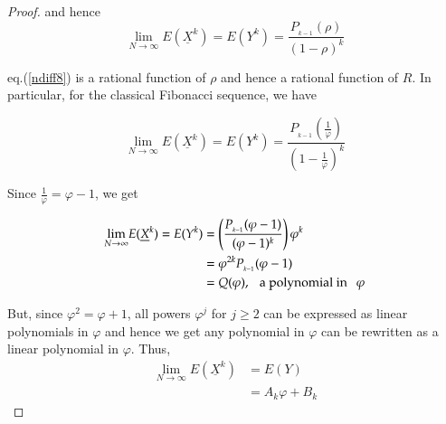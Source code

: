 \begin{multicols}{2}
\begin{proof}
\vspace{-.8cm}

and hence
\begin{equation}
\label{eq-13.13}
\displaystyle{\lim_{N \rightarrow \infty}}E(\underline{X}^k) = E(Y^k) = \displaystyle{\frac{P_{_{k-1}}(\rho)}{(1-\rho)^k}}
\end{equation}

eq.(\ref{ndiff8}) is a rational function of $\rho$ and hence a rational function of $R$. In particular, for the classical Fibonacci sequence, we have

\vspace{-.6cm}

\begin{equation}\nonumber
\displaystyle{\lim_{N \rightarrow \infty}} E(\underline{X}^k) = E(Y^k) = \frac{P_{_{k-1}}\left(\displaystyle{\frac{1}{\varphi}}\right)}{\left(1-\displaystyle{\frac{1}{\varphi}}\right)^k}
\end{equation}

\vspace{-.8cm}

Since $\displaystyle{\frac{1}{\varphi}} = \varphi-1$, we get

\vspace{-.8cm}
\begin{align}
\displaystyle{\lim_{N \rightarrow \infty}} E(\underline{X}^k) = E(Y^k) &= \left(\frac{P_{_{k-1}}(\varphi-1)}{(\varphi-1)^k}\right)\varphi^k\nonumber\\
&= \varphi^{2k} P_{_{k-1}}(\varphi-1)\nonumber\\
&= Q(\varphi), \hspace{0.1in}\textup{a polynomial in}\hspace{0.1in} \varphi \label{eq-13.14}
\end{align}

\vspace{-.6cm}

But, since $\varphi^2 = \varphi + 1$, all powers $\varphi^j$ for $j\ge2$ can be expressed as linear polynomials in $\varphi$ and hence we get any polynomial in $\varphi$ can be rewritten as a linear polynomial in $\varphi$. Thus,
\begin{align}
 \displaystyle{\lim_{N \rightarrow \infty}} E(\underline{X}^k) &= E(Y)\label{eq-13.15}\\
         &= A_k\varphi + B_k\label{eq-13.16}
\end{align}

\end{proof}


\end{multicols}
